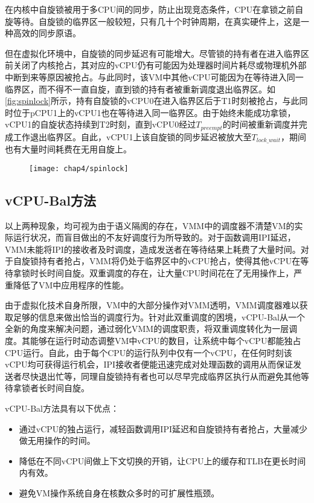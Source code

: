 在内核中自旋锁被用于多CPU间的同步，防止出现竞态条件，CPU在拿锁之前自旋等待。自旋锁的临界区一般较短，只有几十个时钟周期，在真实硬件上，这是一种高效的同步原语。

但在虚拟化环境中，自旋锁的同步延迟有可能增大。尽管锁的持有者在进入临界区前关闭了内核抢占，其对应的vCPU仍有可能因为处理器时间片耗尽或物理机外部中断到来等原因被抢占。与此同时，该VM中其他vCPU可能因为在等待进入同一临界区，而不得不一直自旋，直到锁的持有者被重新调度退出临界区。如\ref{fig:spinlock}所示，持有自旋锁的vCPU0在进入临界区后于T1时刻被抢占，与此同时位于pCPU1上的vCPU1也在等待进入同一临界区。由于始终未能成功拿锁，vCPU1的自旋状态持续到T2时刻，直到vCPU0经过$T_{preempt}$的时间被重新调度并完成工作退出临界区。自此，vCPU1上该自旋锁的同步延迟被放大至$T_{lock\_wait}$，期间也有大量时间耗费在无用自旋上。

\begin{figure}[!htp]
  \centering
  \texttt{[image: chap4/spinlock]}
\end{figure}

\subsection{vCPU-Bal方法}

以上两种现象，均可视为由于语义隔阂的存在，VMM中的调度器不清楚VM的实际运行状况，而盲目做出的不友好调度行为所导致的。对于函数调用IPI延迟，VMM未能将IPI的接收者及时调度，造成发送者在等待结果上耗费了大量时间。对于自旋锁持有者抢占，VMM将仍处于临界区中的vCPU抢占，使得其他vCPU在等待拿锁时长时间自旋。双重调度的存在，让大量CPU时间花在了无用操作上，严重降低了VM中应用程序的性能。

由于虚拟化技术自身所限，VM中的大部分操作对VMM透明，VMM调度器难以获取足够的信息来做出恰当的调度行为。针对此双重调度的困境，vCPU-Bal从一个全新的角度来解决问题，通过弱化VMM的调度职责，将双重调度转化为一层调度。其能够在运行时动态调整VM中vCPU的数目，让系统中每个vCPU都能独占CPU运行。自此，由于每个CPU的运行队列中仅有一个vCPU，在任何时刻该vCPU均可获得运行机会，IPI接收者便能迅速完成对处理函数的调用从而保证发送者尽快退出忙等，同理自旋锁持有者也可以尽早完成临界区执行从而避免其他等待拿锁者长时间自旋。

vCPU-Bal方法具有以下优点：

\begin{itemize}
\item{通过vCPU的独占运行，减轻函数调用IPI延迟和自旋锁持有者抢占，大量减少做无用操作的时间。}
\item{降低在不同vCPU间做上下文切换的开销，让CPU上的缓存和TLB在更长时间内有效。}
\item{避免VM操作系统自身在核数众多时的可扩展性瓶颈。}
\end{itemize}



